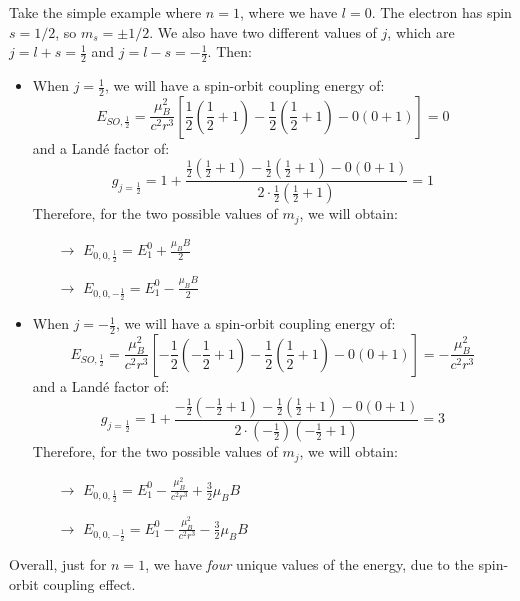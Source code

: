 Take the simple example where $n=1$, where we have $l = 0$. The electron has spin $s=1/2$, so $m_s=\pm 1/2$. We also have two different values of $j$, which are $j = l+s = \frac12$ and $j = l - s = -\frac12$. Then: %
\begin{itemize}
    \item When $j=\frac12$, we will have a spin-orbit coupling energy of:
    \begin{equation}
        E_{SO,\frac12} = \frac{\mu_B^2}{c^2r^3}\left[\frac12 \left(\frac12+1\right)-\frac12\left(\frac12+1\right)-0\left(0+1\right)\right] = 0
    \end{equation}
    and a Landé factor of:
    \begin{equation}
        g_{j=\frac12} = 1+\frac{\frac12 \left(\frac12+1\right)-\frac12\left(\frac12+1\right)-0\left(0+1\right)}{2\cdot \frac12 \left(\frac12+1\right)} = 1
    \end{equation}
    Therefore, for the two possible values of $m_j$, we will obtain:
    \begin{itemize}
        \item[$\to$] $E_{0,0,\frac12} = E_1^0+\frac{\mu_B B}{2}$
        \item[$\to$] $E_{0,0,-\frac12} = E_1^0-\frac{\mu_B B}{2}$
    \end{itemize}
    \item When $j=-\frac12$, we will have a spin-orbit coupling energy of:
    \begin{equation}
        E_{SO,\frac12} = \frac{\mu_B^2}{c^2r^3}\left[-\frac12 \left(-\frac12+1\right)-\frac12\left(\frac12+1\right)-0\left(0+1\right)\right] = -\frac{\mu_B^2}{c^2r^3}
    \end{equation}
    and a Landé factor of:
    \begin{equation}
        g_{j=\frac12} = 1+\frac{-\frac12 \left(-\frac12+1\right)-\frac12\left(\frac12+1\right)-0\left(0+1\right)}{2\cdot \left(-\frac12\right) \left(-\frac12+1\right)} = 3
    \end{equation}
    Therefore, for the two possible values of $m_j$, we will obtain:
    \begin{itemize}
        \item[$\to$] $E_{0,0,\frac12} = E_1^0 -\frac{\mu_B^2}{c^2r^3}+\frac{3}{2}\mu_B B$
        \item[$\to$] $E_{0,0,-\frac12} = E_1^0-\frac{\mu_B^2}{c^2r^3}-\frac{3}{2}\mu_B B$
    \end{itemize}
\end{itemize}

Overall, just for $n=1$, we have \textit{four} unique values of the energy, due to the spin-orbit coupling effect.
